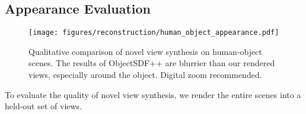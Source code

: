 \subsection{Appearance Evaluation}
\begin{figure}
    \centering    \texttt{[image: figures/reconstruction/human\_object\_appearance.pdf]}
    \caption{Qualitative comparison of novel view synthesis on human-object scenes. 
    The results of ObjectSDF++ are blurrier than our rendered views, especially around the object. 
    Digital zoom recommended. 
    } \label{fig:human_object_appearance}
    \vspace{-1em}
\end{figure}
To evaluate the quality of novel view synthesis, we render the entire scenes into a held-out set of views. 
\begin{table}[t]
\end{table}
